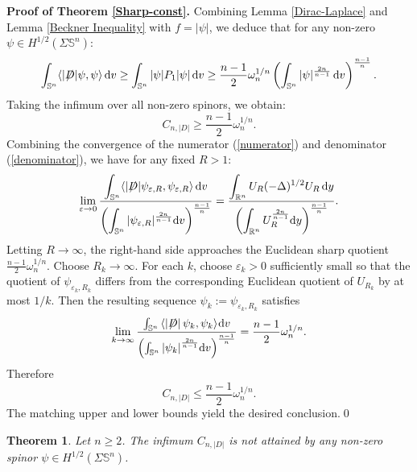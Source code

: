 \documentclass[a4paper, 12pt]{article}
\newtheorem{theorem}{Theorem}[section]
\def\slashiii#1{\setbox0=\hbox{$#1$}#1\hskip-\wd0\hbox to\wd0{\hss\sl/\/\hss}}
\begin{document}
\noindent\textbf{Proof of Theorem \ref{Sharp-const}. } Combining Lemma \ref{Dirac-Laplace} and Lemma \ref{Beckner Inequality} with $f = |\psi|$, we deduce that for any non-zero $\psi \in H^{1/2}(\Sigma \mathbb{S}^n)$:
$$
\int_{\mathbb{S}^n} \langle |\slashiii{D}|\psi, \psi \rangle \, \text{d}v \ge \int_{\mathbb{S}^n} |\psi| P_1 |\psi| \, \text{d}v \ge \frac{n-1}{2} \omega_n^{1/n} \left( \int_{\mathbb{S}^n} |\psi|^{\frac{2n}{n-1}} \, \text{d}v \right)^{\frac{n-1}{n}}.
$$
Taking the infimum over all non-zero spinors, we obtain:
$$
C_{n,|D|} \ge \frac{n-1}{2} \omega_n^{1/n}.
$$
Combining the convergence of the numerator (\ref{numerator}) and denominator (\ref{denominator}), we have for any fixed $R > 1$:
$$
\lim_{\varepsilon \to 0} \frac{\displaystyle \int_{\mathbb{S}^n} \langle |\slashiii{D}|\psi_{\varepsilon,R}, \psi_{\varepsilon,R} \rangle \, \text{d}v}{\displaystyle \left( \int_{\mathbb{S}^n} |\psi_{\varepsilon,R}|^{\frac{2n}{n-1}} \text{d}v \right)^{\frac{n-1}{n}}} = \frac{\displaystyle \int_{\mathbb{R}^n} U_R (-\Delta)^{1/2} U_R \, \text{d}y}{\displaystyle \left( \int_{\mathbb{R}^n} U_R^{\frac{2n}{n-1}} \text{d}y \right)^{\frac{n-1}{n}}}.
$$
Letting $R \to \infty$, the right-hand side approaches the Euclidean sharp quotient $\frac{n-1}{2} \omega_n^{1/n}$. 
Choose \(R_k\to\infty\). For each \(k\), choose \(\varepsilon_k>0\) sufficiently
small so that the quotient of \(\psi_{\varepsilon_k,R_k}\) differs from the
corresponding Euclidean quotient of \(U_{R_k}\) by at most \(1/k\). Then the
resulting sequence \(\psi_k:=\psi_{\varepsilon_k,R_k}\) satisfies
\[
\mathop {\lim }\limits_{k \to \infty} \frac{{\int_{{\mathbb{S}^n}} {\left\langle {\left|\slashiii{D} \right|{\psi _k},{\psi _k}} \right\rangle } {\mkern 1mu} {\text{d}}v}}{{{{\left( {{{\int_{{\mathbb{S}^n}} {\left| {{\psi _k}} \right|} }^{\frac{{2n}}{{n - 1}}}}{\text{d}}v} \right)}^{\frac{{n - 1}}{n}}}}}=
\frac{n-1}{2}\omega_n^{1/n}.
\]
Therefore
$$
C_{n,|D|} \le \frac{n-1}{2} \omega_n^{1/n}.
$$
The matching upper and lower bounds yield the desired conclusion.\qed

\begin{theorem}
	Let $n \ge 2$. The infimum $C_{n,|D|}$ is not attained by any non-zero spinor $\psi \in H^{1/2}(\Sigma \mathbb{S}^n)$.
\end{theorem}
\end{document}
